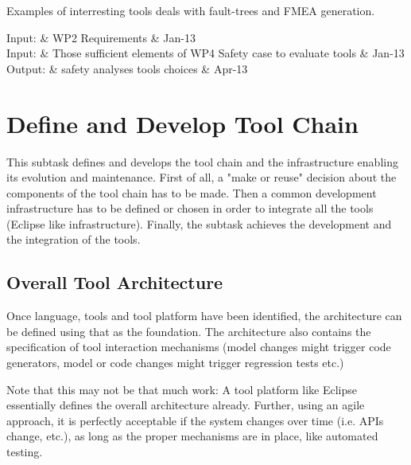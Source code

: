 \documentclass{template/openetcs_article}
\begin{document}
Examples of interresting tools deals with fault-trees and FMEA generation. 
  
 


\begin{inoutput}
Input: & WP2 Requirements & Jan-13 \\
Input: & Those sufficient elements of WP4 Safety case to evaluate tools & Jan-13 \\
\hline
Output: & safety analyses tools choices & Apr-13 \\
\end{inoutput}



\section{Define and Develop Tool Chain}\label{sec:devtoolchain}


This subtask defines and develops the tool chain and the infrastructure enabling its evolution and maintenance. First of all, a "make or reuse" decision about the components of the tool chain has to be made. Then a common development infrastructure has to be defined or chosen in order to integrate all the tools (Eclipse like infrastructure). Finally, the subtask achieves the development and the integration of the tools.

\subsection{Overall Tool Architecture}

Once language, tools and tool platform have been identified, the architecture can be defined using that as the foundation.  The architecture also contains the specification of tool interaction mechanisms (model changes might trigger code generators, model or code changes might trigger regression tests etc.) 

Note that this may not be that much work:  A tool platform like Eclipse essentially defines the overall architecture already.  Further, using an agile approach, it is perfectly acceptable if the system changes over time (i.e. APIs change, etc.), as long as the proper mechanisms are in place, like automated testing.
\end{document}
